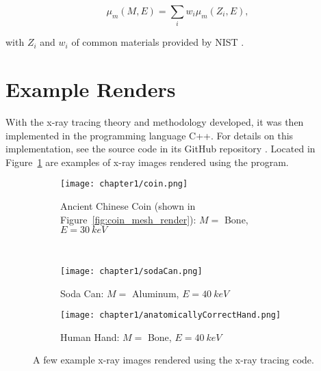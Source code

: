 \begin{equation}
  \mu_m(M, E) = \sum_i w_i \mu_m(Z_i, E),
  \label{eq:mu_weighted}
\end{equation}

\noindent with {$Z_i$} and {$w_i$} of common materials provided by NIST \cite{hubbell1982photon}.

\section{Example Renders}
With the x-ray tracing theory and methodology developed, it was then implemented in the programming language C++. For details on this implementation, see the source code in its GitHub repository \cite{xraytracing_git}. Located in Figure~\ref{fig:example_renders} are examples of x-ray images rendered using the program.

\begin{figure}[htb!]
  \centering
  \begin{subfigure}[b]{\textwidth}
    \centering
    \texttt{[image: chapter1/coin.png]}
    \caption{Ancient Chinese Coin (shown in Figure~\ref{fig:coin_mesh_render}): $M =$ Bone, $E = \qty{30}{keV}$}
  \end{subfigure}
  \\[1ex]
  \begin{subfigure}[b]{0.45\textwidth}
    \centering
      \texttt{[image: chapter1/sodaCan.png]}
      \caption{Soda Can: $M =$ Aluminum, $E = \qty{40}{keV}$}
  \end{subfigure}
  \hfill %
  \begin{subfigure}[b]{0.45\textwidth}
      \centering
      \texttt{[image: chapter1/anatomicallyCorrectHand.png]}
      \caption{Human Hand: $M =$ Bone, $E = \qty{40}{keV}$}
  \end{subfigure}
  \caption{A few example x-ray images rendered using the x-ray tracing code.}
  \label{fig:example_renders}
\end{figure}







  






